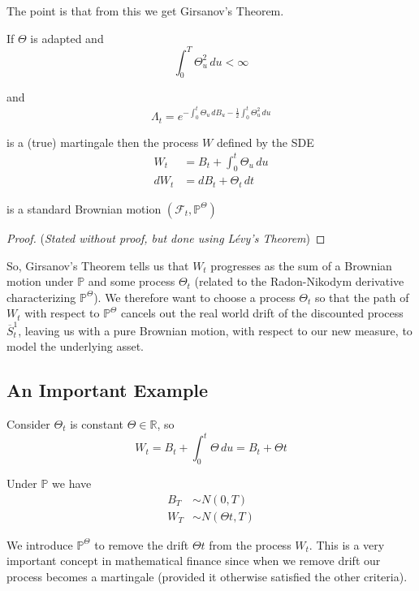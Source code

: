 \documentclass[12pt]{article}
\newenvironment{theorem}[2][Theorem:]{\begin{trivlist} %
\item[\hskip \labelsep {\bfseries #1}\hskip \labelsep {\bfseries #2.}]}{\end{trivlist}}
\newlength\tindent
\renewcommand{\indent}{\hspace*{\tindent}}
\begin{document}
The point is that from this we get Girsanov's Theorem.
\begin{theorem}{Girsanov's Theorem} If $\Theta$ is adapted and 
\begin{equation*}
	\int^T_0 \Theta^2_u\,du < \infty
\end{equation*}

and
\begin{equation*}
	\Lambda_t = e^{-\int^t_0 \Theta_u\,dB_u - \frac{1}{2}\int^t_0\Theta^2_u\,du}
\end{equation*}

is a (true) martingale then the process $W$ defined by the SDE
\begin{align*}
	W_t &= B_t + \int^t_0\Theta_u\,du \\
	dW_t &= dB_t + \Theta_t\,dt
\end{align*}

is a standard Brownian motion $(\mathcal F_t,\mathbb P^\Theta)$
\begin{proof} ({\em Stated without proof, but done using L\'{e}vy's Theorem})
\end{proof}
\end{theorem}

\indent So, Girsanov's Theorem tells us that $W_t$ progresses as the sum of a Brownian motion under $\mathbb P$ and some process $\Theta_t$ (related to the Radon-Nikodym derivative characterizing $\mathbb P^\Theta$). We therefore want to choose a process $\Theta_t$ so that the path of $W_t$ with respect to $\mathbb P^\Theta$ cancels out the real world drift of the discounted process $\overline{S}^1_t$, leaving us with a pure Brownian motion, with respect to our new measure, to model the underlying asset.

\subsection{An Important Example}

Consider $\Theta_t$ is constant $\Theta \in \mathbb R$, so
\begin{equation*}
	W_t = B_t + \int^t_0 \Theta\,du = B_t + \Theta t
\end{equation*}

Under $\mathbb P$ we have
\begin{align*}
	B_T&\sim N(0,T) \\
	W_T&\sim N(\Theta t, T)
\end{align*}

\indent We introduce $\mathbb P^\Theta$ to remove the drift $\Theta t$ from the process $W_t$. This is a very important concept in mathematical finance since when we remove drift our process becomes a martingale (provided it otherwise satisfied the other criteria).
\end{document}
